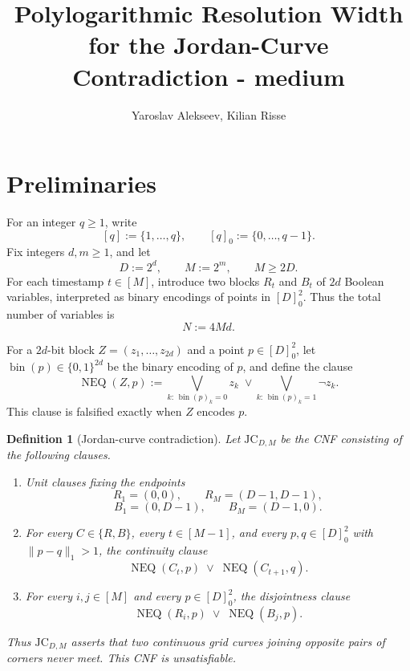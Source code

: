 \documentclass[10pt]{article}
\title{Polylogarithmic Resolution Width for the Jordan-Curve Contradiction - medium}
\author{Yaroslav Alekseev, Kilian Risse}
\date{}
\newtheorem{definition}{Definition}
\begin{document}
\maketitle

\section{Preliminaries}

For an integer $q\ge 1$, write
\[
[q]:=\{1,\ldots,q\},
\qquad
[q]_0:=\{0,\ldots,q-1\}.
\]
Fix integers $d,m\ge 1$, and let
\[
D:=2^d,
\qquad
M:=2^m,
\qquad
M\ge 2D.
\]
For each timestamp $t\in[M]$, introduce two blocks $R_t$ and $B_t$ of
$2d$ Boolean variables, interpreted as binary encodings of points in
$[D]_0^2$.  Thus the total number of variables is
\[
N:=4Md.
\]

For a $2d$-bit block $Z=(z_1,\ldots,z_{2d})$ and a point
$p\in[D]_0^2$, let $\operatorname{bin}(p)\in\{0,1\}^{2d}$ be the binary
encoding of $p$, and define the clause
\[
\operatorname{NEQ}(Z,p)
:=
\bigvee_{k:\,\operatorname{bin}(p)_k=0} z_k
\;\vee\!
\bigvee_{k:\,\operatorname{bin}(p)_k=1} \neg z_k.
\]
This clause is falsified exactly when $Z$ encodes $p$.

\begin{definition}[Jordan-curve contradiction]
Let $\mathrm{JC}_{D,M}$ be the CNF consisting of the following clauses.

\begin{enumerate}
    \item Unit clauses fixing the endpoints
    \[
    R_1=(0,0),
    \qquad
    R_M=(D-1,D-1),
    \]
    \[
    B_1=(0,D-1),
    \qquad
    B_M=(D-1,0).
    \]

    \item For every $C\in\{R,B\}$, every $t\in[M-1]$, and every
    $p,q\in[D]_0^2$ with $\lVert p-q\rVert_1>1$, the continuity clause
    \[
    \operatorname{NEQ}(C_t,p)
    \;\vee\;
    \operatorname{NEQ}(C_{t+1},q).
    \]

    \item For every $i,j\in[M]$ and every $p\in[D]_0^2$, the
    disjointness clause
    \[
    \operatorname{NEQ}(R_i,p)
    \;\vee\;
    \operatorname{NEQ}(B_j,p).
    \]
\end{enumerate}

Thus $\mathrm{JC}_{D,M}$ asserts that two continuous grid curves joining
opposite pairs of corners never meet.  This CNF is unsatisfiable.
\end{definition}
\end{document}
